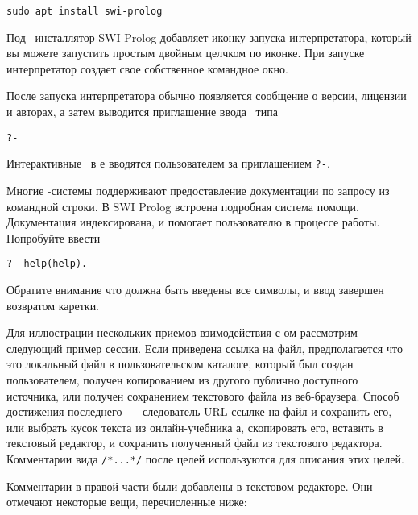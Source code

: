 \begin{verbatim}
sudo apt install swi-prolog
\end{verbatim}

\bigskip
Под \win\ инсталлятор SWI-Prolog добавляет иконку запуска
интерпретатора, который вы можете запустить простым двойным целчком по
иконке. При запуске интерпретатор создает свое собственное командное окно.
\bigskip

После запуска интерпретатора обычно появляется сообщение о версии, лицензии и
авторах, а затем выводится приглашение ввода \ типа

\begin{verbatim}
?- _
\end{verbatim}

Интерактивные \ в \prolog е вводятся пользователем за приглашением
\verb|?-|.

Многие \prolog-системы поддерживают предоставление документации по запросу из
командной строки. В SWI Prolog встроена подробная система помощи. Документация
индексирована, и помогает пользователю в процессе работы. Попробуйте ввести

\begin{verbatim}
?- help(help).
\end{verbatim}

Обратите внимание что должна быть введены все символы, и ввод завершен возвратом
каретки.

Для иллюстрации нескольких приемов взимодействия с \prolog ом рассмотрим
следующий пример сессии. Если приведена ссылка на файл, предполагается что это
локальный файл в пользовательском каталоге, который был создан пользователем,
получен копированием из другого публично доступного источника, или получен
сохранением текстового файла из веб-браузера. Способ достижения последнего\ ---
следователь URL-ссылке на файл и сохранить его, или выбрать кусок текста из
онлайн-учебника \prolog а, скопировать его, вставить в текстовый редактор, и
сохранить полученный файл из текстового редактора. Комментарии вида
\verb|/*...*/| после целей используются для описания этих целей.


Комментарии в правой части были добавлены в текстовом редакторе. Они отмечают
некоторые вещи, перечисленные ниже:

